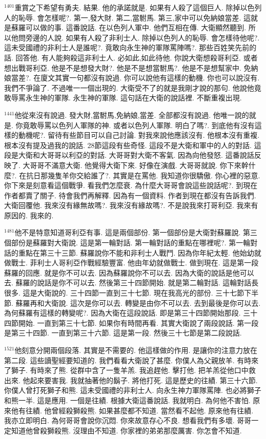 \documentclass{book}
\begin{document}
$^{1401}$重賞之下希望有勇夫.
結果.
他的承諾就是.
如果有人殺了這個巨人.
除掉以色列人的恥辱.
會怎樣呢?.
第一,發大財.
第二,當駙馬.
第三,家中可以免納娘當差.
這就是蘇羅可以做的事.
這番說話.
在以色列人軍中.
他們互相在傳.
大衛顯然聽到.
所以他問旁邊的人說.
如果有人殺了非利士人.
除掉以色列人的恥辱.
會怎樣待他呢?.
這未受國禮的非利士人是誰呢?.
竟敢向永生神的軍隊罵陣嗎?.
那些百姓笑先前的話.
回答他.
有人能夠殺這非利士人.
必如此,如此待他.
你說大衛想殺哥利亞.
或者想出戰哥利亞.
他是不是想發大財?.
他是不是想當駙馬?.
他是不是想幫家中.
免納娘當差?.
在廈文其實一句都沒有說過.
你可以說他有這樣的動機.
你也可以說沒有.
我們不爭論了.
不過唯一一個出現的.
大衛受不了的就是我剛才說的那句.
他說他竟敢辱罵永生神的軍隊.
永生神的軍隊.
這句話在大衛的說話裡.
不斷重複出現.

$^{1441}$他從來沒有說過.
發大財,當駙馬,免納娘,當差.
全部都沒有說過.
他唯一說的就是.
你竟敢辱罵以色列人軍隊的神.
或者以色列人軍隊.
明白了嗎?.
到底他有沒有這樣的動機呢?.
留待有些節目可以自己討論.
對我來說他應該沒有.
他根本沒有重複.
根本沒有提及過我的說話.
28節這段有些奇怪.
這段不是大衛和軍中的人的對話.
這段是大衛和大哥哥以利亞的對話.
大哥哥對大衛不客氣.
因為向他發怒.
這番說話反映了.
大哥哥不滿意大衛.
他覺得大衛下來.
好像在演戲.
大哥哥就說.
你下來幹什麼?.
在抗日那幾隻羊你交給誰了?.
其實是在罵他.
我知道你很驕傲.
你心裡的惡意.
你下來是刻意看這個戰爭.
看我們怎麼衰.
為什麼大哥哥會說這些說話呢?.
到現在作者都賣了關子.
待會我們再解釋.
因為有一個資料.
作者到現在都沒有告訴我們.
大衛回覆他.
我來沒有緣無故嗎?.
我來沒有緣故嗎?.
不是說我來打哥利亞.
我來有原因的.
我來的.

$^{1481}$他不是特意知道哥利亞有事.
這是兩個部份.
第一個部份是大衛對蘇羅說.
第三個部份是蘇羅對大衛說.
這是第一輪對話.
第一輪對話的重點在哪裡呢?.
第一輪對話的重點在第三十三節.
蘇羅說你不能和非利士人戰鬥.
因為你年紀太輕.
他始幼就做戰士.
菲利士人哥利亞作戰經驗豐富.
他由年幼就做戰士.
做到現在.
這是第一段蘇羅的回應.
就是你不可以去.
因為蘇羅說你不可以去.
因為大衛的說話是他可以去.
蘇羅的說話是你不可以去.
然後第三十四節開始.
就是第二輪對話.
這輪對話長很多.
這是大衛說的.
三十四節一直到三十七節.
現在我高光的部份.
三十七節下半節.
蘇羅再和大衛說.
這次是你可以去.
轉變是由你不可以去.
去到最後是你可以去.
為何蘇羅有這樣的轉變呢?.
因為大衛在這段說話.
即是第三十四節開始那段.
三十四節開始.
一直到第三十七節.
如果你有時間再看.
其實大衛說了兩段說話.
第一段是第三十四節.
一直到第三十六節.
這是第一段.
然後三十七節是第二段說話.

$^{1521}$他刻意分開兩個段落.
其實是不需要的.
他這樣做的作用.
是讓你的注意力放在第二段.
這些讀聖經要知道的.
我們看看大衛說了甚麼.
你僕人為父親放羊.
有時來了獅子.
有時來了熊.
從群中含了一隻羊羔.
我追趕他.
擊打他.
把羊羔從他口中救出來.
他起來要害我.
我就抽著他的鬍子.
將他打死.
這是歷史的往績.
第三十六節.
你僕人曾打死獅子和熊.
這未受國禮的非利士人.
向永生神力軍隊罵陣.
也必將獅子和熊一半.
這是應用.
一個是往績.
根據大衛這番說話.
我就明白.
為何他不害怕.
原來他有往績.
他曾經殺獅殺熊.
如果甚麼都不知道.
當然看不起他.
原來他有往績.
我亦立即明白.
為何哥哥會說你沉悶.
你來故意存心不良.
想看我們有多壞.
哥哥一定知道他曾殺獅殺熊.
沒理由不知道.
你家裡的弟弟那麼厲害.
你怎會不知道.
\end{document}
